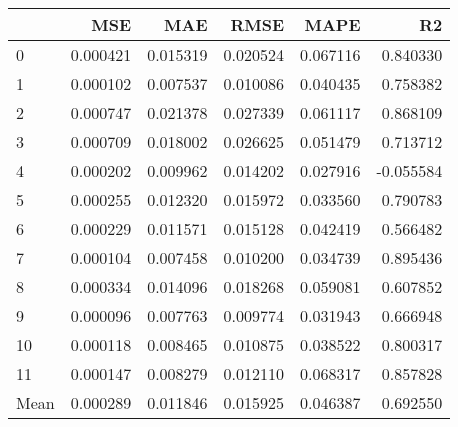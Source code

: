 \begin{tabular}{lrrrrr}
\toprule
 & MSE & MAE & RMSE & MAPE & R2 \\
\midrule
0 & 0.000421 & 0.015319 & 0.020524 & 0.067116 & 0.840330 \\
1 & 0.000102 & 0.007537 & 0.010086 & 0.040435 & 0.758382 \\
2 & 0.000747 & 0.021378 & 0.027339 & 0.061117 & 0.868109 \\
3 & 0.000709 & 0.018002 & 0.026625 & 0.051479 & 0.713712 \\
4 & 0.000202 & 0.009962 & 0.014202 & 0.027916 & -0.055584 \\
5 & 0.000255 & 0.012320 & 0.015972 & 0.033560 & 0.790783 \\
6 & 0.000229 & 0.011571 & 0.015128 & 0.042419 & 0.566482 \\
7 & 0.000104 & 0.007458 & 0.010200 & 0.034739 & 0.895436 \\
8 & 0.000334 & 0.014096 & 0.018268 & 0.059081 & 0.607852 \\
9 & 0.000096 & 0.007763 & 0.009774 & 0.031943 & 0.666948 \\
10 & 0.000118 & 0.008465 & 0.010875 & 0.038522 & 0.800317 \\
11 & 0.000147 & 0.008279 & 0.012110 & 0.068317 & 0.857828 \\
Mean & 0.000289 & 0.011846 & 0.015925 & 0.046387 & 0.692550 \\
\bottomrule
\end{tabular}
